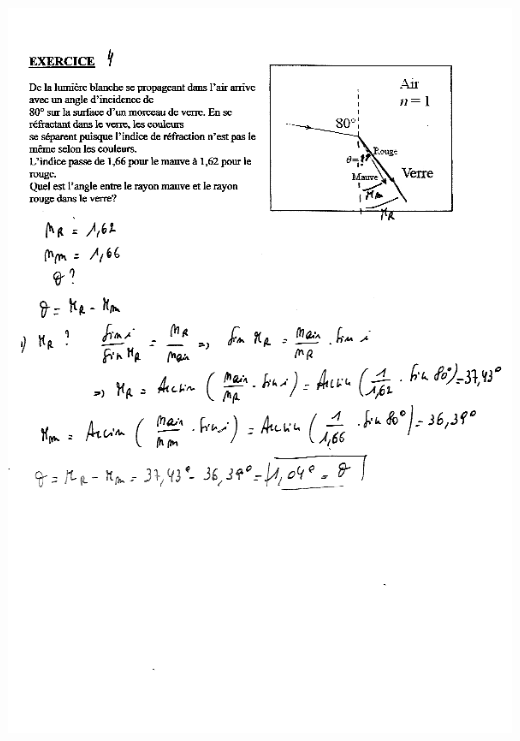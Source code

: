 \includegraphics[width=17.503cm,height=25.174cm]{Pictures/100000010000024D0000034F56B8138A5D6394A6.png}


